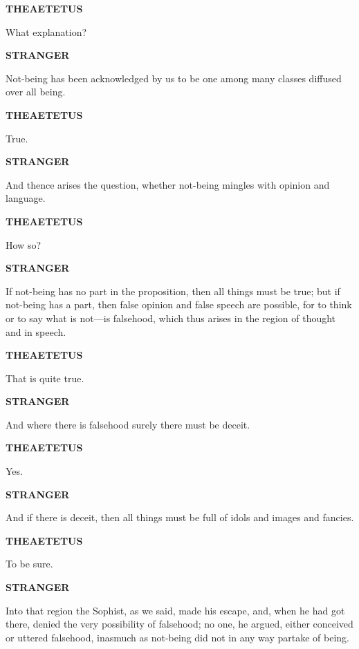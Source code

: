 \documentclass[11pt,letter]{article}
\begin{document}
\par \textbf{THEAETETUS}
\par   What explanation?

\par \textbf{STRANGER}
\par   Not-being has been acknowledged by us to be one among many classes diffused over all being.

\par \textbf{THEAETETUS}
\par   True.

\par \textbf{STRANGER}
\par   And thence arises the question, whether not-being mingles with opinion and language.

\par \textbf{THEAETETUS}
\par   How so?

\par \textbf{STRANGER}
\par   If not-being has no part in the proposition, then all things must be true; but if not-being has a part, then false opinion and false speech are possible, for to think or to say what is not—is falsehood, which thus arises in the region of thought and in speech.

\par \textbf{THEAETETUS}
\par   That is quite true.

\par \textbf{STRANGER}
\par   And where there is falsehood surely there must be deceit.

\par \textbf{THEAETETUS}
\par   Yes.

\par \textbf{STRANGER}
\par   And if there is deceit, then all things must be full of idols and images and fancies.

\par \textbf{THEAETETUS}
\par   To be sure.

\par \textbf{STRANGER}
\par   Into that region the Sophist, as we said, made his escape, and, when he had got there, denied the very possibility of falsehood; no one, he argued, either conceived or uttered falsehood, inasmuch as not-being did not in any way partake of being.
\end{document}
